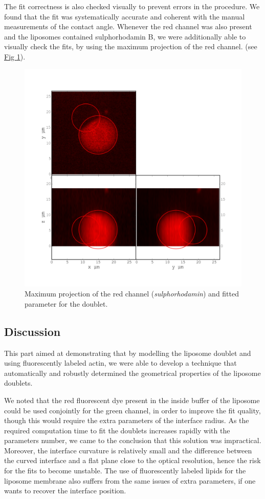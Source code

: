 \documentclass[A4paperpaper,11pt,english]{sphinxmanual}
\begin{document}
The fit correctness is also checked visually to prevent errors in the
procedure.  We found that the fit was systematically accurate and coherent with the manual
measurements of the contact angle.  Whenever the red channel was also present and the liposomes
contained sulphorhodamin B, we were additionally able to visually check the fits, by using the maximum
projection of the red channel.  (see \hyperref[parts/part4:srhod]{Fig  \ref*{parts/part4:srhod}}).
\begin{figure}[htbp]
\centering
\capstart

\includegraphics[width=0.800\linewidth]{srhod_superimpose.png}
\caption{Maximum projection of the red channel (\emph{sulphorhodamin}) and fitted
parameter for the doublet.}\label{parts/part4:srhod}\end{figure}


\subsection{Discussion}
\label{parts/part4:id24}
This part aimed at demonstrating that by modelling the liposome doublet and using
fluorescently labeled actin, we were able to develop a technique that
automatically and robustly determined the geometrical properties of the liposome
doublets.

We noted that the red fluorescent dye present in the inside buffer of the
liposome could be used conjointly for the green channel, in order to improve the
fit quality, though this would require the extra parameters of the
interface radius. As the required computation time to fit the doublets increases
rapidly with the parameters number,
we came to the conclusion that this solution was impractical.  Moreover, the interface curvature is relatively small
and the difference between the curved interface and a flat plane close to
the optical resolution, hence the risk for the fits to become unstable.  The use of
fluorescently labeled lipids for the liposome membrane also suffers from the
same issues of extra parameters, if one wants to recover the interface position.
\end{document}
